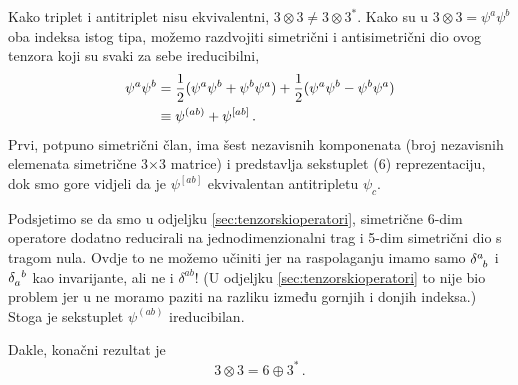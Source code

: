 \begin{primjer}[$3\otimes 3$]
Kako triplet i antitriplet nisu ekvivalentni, $3\otimes 3
\neq 3\otimes 3^*$. Kako su u
$3\otimes 3 = \psi^a \psi^b$ oba indeksa istog tipa,
možemo razdvojiti simetrični i antisimetrični dio ovog
tenzora koji su svaki za sebe ireducibilni,
\begin{align}
\psi^a \psi^b &= \frac{1}{2} (\psi^a\psi^b + \psi^b \psi^a)
               + \frac{1}{2} (\psi^a\psi^b - \psi^b \psi^a) \\
              &\equiv \psi^{(ab)} + \psi^{[ab]} \,.
\end{align}
Prvi, potpuno simetrični član, ima šest nezavisnih komponenata
(broj nezavisnih elemenata simetrične 3$\times$3 matrice) i
predstavlja sekstuplet (6) reprezentaciju, dok smo gore
vidjeli da je $\psi^{[ab]}$ ekvivalentan antitripletu
$\psi_c$. 

Podsjetimo se da smo u odjeljku \ref{sec:tenzorskioperatori},
simetrične 6-dim operatore dodatno reducirali na jednodimenzionalni
trag i 5-dim simetrični dio s tragom nula.  Ovdje to ne možemo učiniti
jer na raspolaganju imamo samo 
$\tensor{\delta}{^a_b}$ i $\tensor{\delta}{_a^b}$ kao  invarijante, 
ali ne i $\delta^{ab}$! (U odjeljku \ref{sec:tenzorskioperatori}
to nije bio problem jer u
 ne moramo paziti na razliku između gornjih i donjih indeksa.)
Stoga je sekstuplet $\psi^{(ab)}$ ireducibilan.

Dakle, konačni rezultat je
\begin{equation}
 3 \otimes 3 = 6 \oplus 3^* \,.
\label{eq:33eq63}
\end{equation}
\end{primjer}

